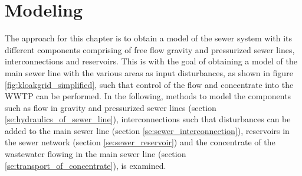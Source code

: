 \chapter{Modeling}\label{se:modeling}

The approach for this chapter is to obtain a model of the sewer system with its different components comprising of free flow gravity and pressurized sewer lines, interconnections and reservoirs. 
This is with the goal of obtaining a model of the main sewer line with the various areas as input disturbances, as shown in figure \ref{fig:kloakgrid_simplified}, such that control of the flow and concentrate into the WWTP can be performed. 
In the following, methods to model the components such as flow in gravity and pressurized sewer lines (section \ref{se:hydraulics_of_sewer_line}), interconnections such that disturbances can be added to the main sewer line (section \ref{se:sewer_interconnection}), reservoirs in the sewer network (section \ref{se:sewer_reservoir}) and the concentrate of the wastewater flowing in the main sewer line (section \ref{se:transport_of_concentrate}), is examined.








